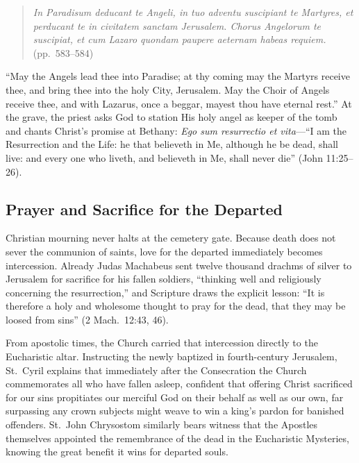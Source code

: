 \begin{quote}
\emph{In Paradisum deducant te Angeli, in tuo adventu suscipiant te Martyres, et perducant te in civitatem sanctam Jerusalem. Chorus Angelorum te suscipiat, et cum Lazaro quondam paupere aeternam habeas requiem.} (pp.\ 583--584)
\end{quote}

``May the Angels lead thee into Paradise; at thy coming may the Martyrs receive thee, and bring thee into the holy City, Jerusalem. May the Choir of Angels receive thee, and with Lazarus, once a beggar, mayest thou have eternal rest.'' At the grave, the priest asks God to station His holy angel as keeper of the tomb and chants Christ's promise at Bethany: \emph{Ego sum resurrectio et vita}---``I am the Resurrection and the Life: he that believeth in Me, although he be dead, shall live: and every one who liveth, and believeth in Me, shall never die'' (John 11:25--26).

\subsection{Prayer and Sacrifice for the Departed}

Christian mourning never halts at the cemetery gate. Because death does not sever the communion of saints, love for the departed immediately becomes intercession. Already Judas Machabeus sent twelve thousand drachms of silver to Jerusalem for sacrifice for his fallen soldiers, ``thinking well and religiously concerning the resurrection,'' and Scripture draws the explicit lesson: ``It is therefore a holy and wholesome thought to pray for the dead, that they may be loosed from sins'' (2 Mach.\ 12:43, 46).

From apostolic times, the Church carried that intercession directly to the Eucharistic altar. Instructing the newly baptized in fourth-century Jerusalem, St.\ Cyril explains that immediately after the Consecration the Church commemorates all who have fallen asleep, confident that offering Christ sacrificed for our sins propitiates our merciful God on their behalf as well as our own, far surpassing any crown subjects might weave to win a king's pardon for banished offenders. St.\ John Chrysostom similarly bears witness that the Apostles themselves appointed the remembrance of the dead in the Eucharistic Mysteries, knowing the great benefit it wins for departed souls.

